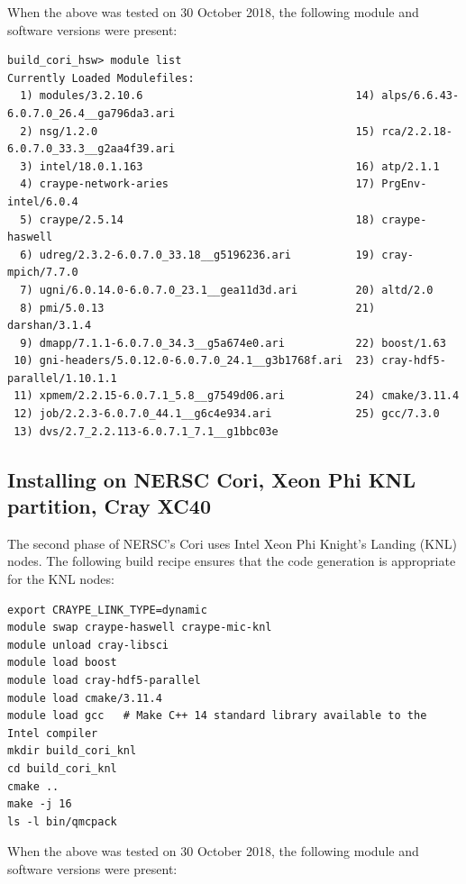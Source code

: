 When the above was tested on 30 October 2018, the following module and
software versions were present:

\verbatimfont{\footnotesize}
\begin{verbatim}
build_cori_hsw> module list
Currently Loaded Modulefiles:
  1) modules/3.2.10.6                                 14) alps/6.6.43-6.0.7.0_26.4__ga796da3.ari
  2) nsg/1.2.0                                        15) rca/2.2.18-6.0.7.0_33.3__g2aa4f39.ari
  3) intel/18.0.1.163                                 16) atp/2.1.1
  4) craype-network-aries                             17) PrgEnv-intel/6.0.4
  5) craype/2.5.14                                    18) craype-haswell
  6) udreg/2.3.2-6.0.7.0_33.18__g5196236.ari          19) cray-mpich/7.7.0
  7) ugni/6.0.14.0-6.0.7.0_23.1__gea11d3d.ari         20) altd/2.0
  8) pmi/5.0.13                                       21) darshan/3.1.4
  9) dmapp/7.1.1-6.0.7.0_34.3__g5a674e0.ari           22) boost/1.63
 10) gni-headers/5.0.12.0-6.0.7.0_24.1__g3b1768f.ari  23) cray-hdf5-parallel/1.10.1.1
 11) xpmem/2.2.15-6.0.7.1_5.8__g7549d06.ari           24) cmake/3.11.4
 12) job/2.2.3-6.0.7.0_44.1__g6c4e934.ari             25) gcc/7.3.0
 13) dvs/2.7_2.2.113-6.0.7.1_7.1__g1bbc03e

\end{verbatim}

\subsection{Installing on NERSC Cori, Xeon Phi KNL partition, Cray XC40}
The second phase of NERSC's Cori uses Intel
Xeon Phi Knight's Landing (KNL) nodes. The following build recipe ensures that the code
generation is appropriate for the KNL nodes:

\verbatimfont{\footnotesize}
\begin{verbatim}
export CRAYPE_LINK_TYPE=dynamic
module swap craype-haswell craype-mic-knl
module unload cray-libsci
module load boost
module load cray-hdf5-parallel
module load cmake/3.11.4
module load gcc   # Make C++ 14 standard library available to the Intel compiler
mkdir build_cori_knl
cd build_cori_knl
cmake ..
make -j 16
ls -l bin/qmcpack
\end{verbatim}

When the above was tested on 30 October 2018, the following module and
software versions were present:

